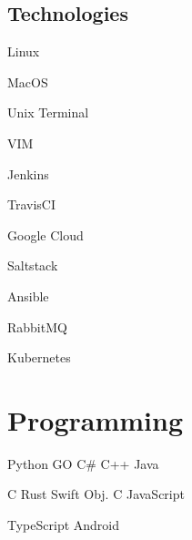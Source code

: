 \documentclass[]{cv}
\begin{document}
\begin{minipage}[t]{0.33\textwidth}
\subsection{Technologies}

\begin{tightemize}
	\item Linux
	\item MacOS
	\item Unix Terminal
	\item VIM
\end{tightemize}
\begin{tightemize}
	\item Jenkins
	\item TravisCI
	\item Google Cloud
	\item Saltstack
	\item Ansible
	\item RabbitMQ
	\item Kubernetes
\end{tightemize}
\sectionsep

\section{Programming}
Python \textbullet GO \textbullet C\# \textbullet C++ \textbullet Java
\sectionsep

C \textbullet Rust \textbullet Swift \textbullet Obj. C \textbullet JavaScript
\sectionsep

TypeScript \textbullet Android

\end{minipage} 
\hfill
\end{document}
